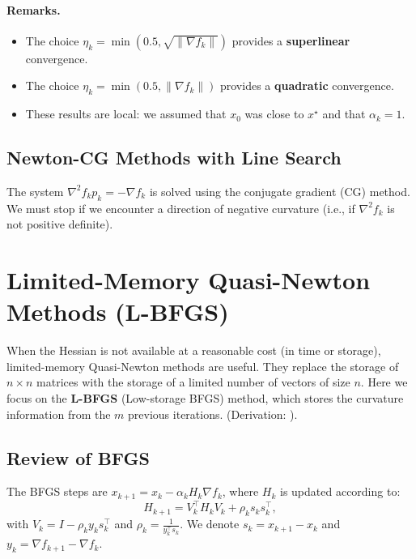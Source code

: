 \paragraph{Remarks.}
\begin{itemize}
    \item The choice $\eta_k = \min(0.5, \sqrt{\| \nabla f_k \|})$ provides a \textbf{superlinear} convergence.
    \item The choice $\eta_k = \min(0.5, \| \nabla f_k \|)$ provides a \textbf{quadratic} convergence.
    \item These results are local: we assumed that $x_0$ was close to $x^\star$ and that $\alpha_k = 1$.
\end{itemize}

\subsection{Newton-CG Methods with Line Search}

The system $\nabla^2 f_k p_k = - \nabla f_k$ is solved using the conjugate gradient (CG) method.
We must stop if we encounter a direction of negative curvature (i.e., if $\nabla^2 f_k$ is not positive definite).

\section{Limited-Memory Quasi-Newton Methods (L-BFGS)}

When the Hessian is not available at a reasonable cost (in time or storage), limited-memory Quasi-Newton methods are useful.
They replace the storage of $n \times n$ matrices with the storage of a limited number of vectors of size $n$.
Here we focus on the \textbf{L-BFGS} (Low-storage BFGS) method, which stores the curvature information from the $m$ previous iterations.
(Derivation: \textit{\cite{nocedal1980updating}}).

\subsection{Review of BFGS}

The BFGS steps are $x_{k+1} = x_k - \alpha_k H_k \nabla f_k$, where $H_k$ is updated according to:
\begin{equation}
    H_{k+1} = V_k^\top H_k V_k + \rho_k s_k s_k^\top,
\end{equation}
with $V_k = I - \rho_k y_k s_k^\top$ and $\rho_k = \frac{1}{y_k^\top s_k}$.
We denote $s_k = x_{k+1} - x_k$ and $y_k = \nabla f_{k+1} - \nabla f_k$.

